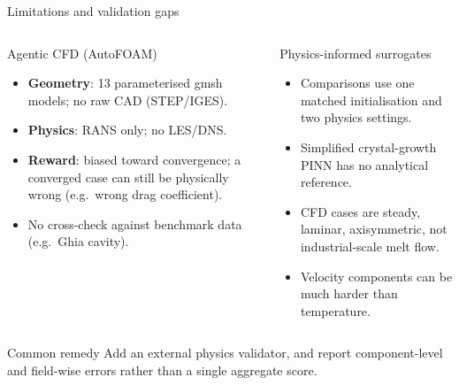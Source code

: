 \documentclass[aspectratio=169,10pt]{beamer}
\begin{document}
\begin{frame}{Limitations and validation gaps}
\begin{columns}[T,onlytextwidth]
\begin{alertblock}{Agentic CFD (AutoFOAM)}
\begin{itemize}\small
  \item \textbf{Geometry}: 13 parameterised gmsh models; no raw CAD (STEP/IGES).
  \item \textbf{Physics}: RANS only; no LES/DNS.
  \item \textbf{Reward}: biased toward convergence; a converged case can still be physically wrong (e.g.\ wrong drag coefficient).
  \item No cross-check against benchmark data (e.g.\ Ghia cavity).
\end{itemize}
\end{alertblock}
\begin{alertblock}{Physics-informed surrogates}
\begin{itemize}\small
  \item Comparisons use one matched initialisation and two physics settings.
  \item Simplified crystal-growth PINN has no analytical reference.
  \item CFD cases are steady, laminar, axisymmetric, not industrial-scale melt flow.
  \item Velocity components can be much harder than temperature.
\end{itemize}
\end{alertblock}
\end{columns}
\vspace{0.2cm}
\begin{exampleblock}{Common remedy}
\small Add an external physics validator, and report component-level and field-wise errors rather
than a single aggregate score.
\end{exampleblock}
\end{frame}
\end{document}
